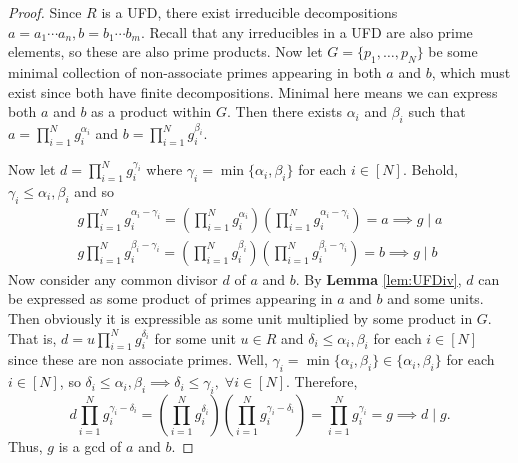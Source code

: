 \documentclass[addpoints,10pt]{exam}
\theoremstyle{plain}
\theoremstyle{definition}
\theoremstyle{plain}
\theoremstyle{plain}
\theoremstyle{definition}
\begin{document}
\begin{proof}
    Since $R$ is a UFD, there exist irreducible decompositions $a=a_{1}\cdots a_{n},b=b_{1}\cdots b_{m}.$ Recall that any irreducibles in a UFD are also prime elements, so these are also prime products. Now let $G=\{p_{1},\hdots,p_{N}\}$ be some minimal collection of non-associate primes appearing in both $a$ and $b$, which must exist since both have finite decompositions. Minimal here means we can express both $a$ and $b$ as a product within $G$. Then there exists $\alpha_{i}$ and $\beta_{i}$ such that $a=\prod_{i=1}^{N} g_{i}^{\alpha_{i}}$ and $b=\prod_{i=1}^{N} g_{i}^{\beta_{i}}$. 
    
    Now let $d=\prod_{i=1}^{N} g_{i}^{\gamma_{i}}$ where $\gamma_{i}=\min\{\alpha_{i},\beta_{i}\}$ for each $i\in [N]$. Behold, $\gamma_{i}\leq \alpha_{i},\beta_{i}$ and so
    \begin{align*}
        g\prod_{i=1}^{N} g_{i}^{\alpha_{i}-\gamma_{i}}=(\prod_{i=1}^{N} g_{i}^{\alpha_{i}})(\prod_{i=1}^{N} g_{i}^{\alpha_{i}-\gamma_{i}})=a\implies g\mid a\\
        g\prod_{i=1}^{N} g_{i}^{\beta_{i}-\gamma_{i}}=(\prod_{i=1}^{N} g_{i}^{\beta_{i}})(\prod_{i=1}^{N} g_{i}^{\beta_{i}-\gamma_{i}})=b\implies g\mid b
    \end{align*}
 Now consider any common divisor $d$ of $a$ and $b$. By \textbf{Lemma }\ref{lem:UFDiv}, $d$ can be expressed as some product of primes appearing in $a$ and $b$ and some units. Then obviously it is expressible as some unit multiplied by some product in $G$. That is, $d=u\prod_{i=1}^{N} g_{i}^{\delta_{i}}$ for some unit $u\in R$ and $\delta_{i}\leq \alpha_{i},\beta_{i}$ for each $i\in [N]$ since these are non associate primes. Well, $\gamma_{i}=\min\{\alpha_{i},\beta_{i}\}\in \{\alpha_{i},\beta_{i}\}$ for each $i\in [N]$, so $\delta_{i}\leq \alpha_{i},\beta_{i}\implies \delta_{i}\leq \gamma_{i},\;\forall i\in [N]$. Therefore,
    $$d\prod_{i=1}^{N} g_{i}^{\gamma_{i}-\delta_{i}}=(\prod_{i=1}^{N} g_{i}^{\delta_{i}})(\prod_{i=1}^{N} g_{i}^{\gamma_{i}-\delta_{i}})=\prod_{i=1}^{N} g_{i}^{\gamma_{i}}=g\implies d\mid g.$$
Thus, $g$ is a gcd of $a$ and $b$.
   
\end{proof}
\end{document}
